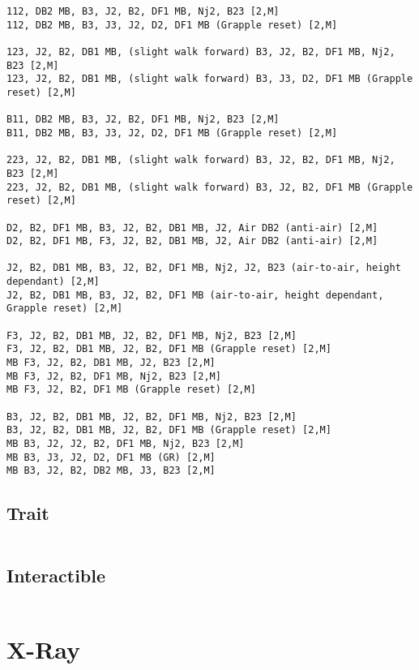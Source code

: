 \documentclass[main.tex]{subfiles}
\begin{document}
\begin{lstlisting}[language=FG]
112, DB2 MB, B3, J2, B2, DF1 MB, Nj2, B23 [2,M]
112, DB2 MB, B3, J3, J2, D2, DF1 MB (Grapple reset) [2,M]

123, J2, B2, DB1 MB, (slight walk forward) B3, J2, B2, DF1 MB, Nj2, B23 [2,M]
123, J2, B2, DB1 MB, (slight walk forward) B3, J3, D2, DF1 MB (Grapple reset) [2,M]

B11, DB2 MB, B3, J2, B2, DF1 MB, Nj2, B23 [2,M]
B11, DB2 MB, B3, J3, J2, D2, DF1 MB (Grapple reset) [2,M]

223, J2, B2, DB1 MB, (slight walk forward) B3, J2, B2, DF1 MB, Nj2, B23 [2,M]
223, J2, B2, DB1 MB, (slight walk forward) B3, J2, B2, DF1 MB (Grapple reset) [2,M]

D2, B2, DF1 MB, B3, J2, B2, DB1 MB, J2, Air DB2 (anti-air) [2,M]
D2, B2, DF1 MB, F3, J2, B2, DB1 MB, J2, Air DB2 (anti-air) [2,M]

J2, B2, DB1 MB, B3, J2, B2, DF1 MB, Nj2, J2, B23 (air-to-air, height dependant) [2,M]
J2, B2, DB1 MB, B3, J2, B2, DF1 MB (air-to-air, height dependant, Grapple reset) [2,M]

F3, J2, B2, DB1 MB, J2, B2, DF1 MB, Nj2, B23 [2,M]
F3, J2, B2, DB1 MB, J2, B2, DF1 MB (Grapple reset) [2,M]
MB F3, J2, B2, DB1 MB, J2, B23 [2,M]
MB F3, J2, B2, DF1 MB, Nj2, B23 [2,M]
MB F3, J2, B2, DF1 MB (Grapple reset) [2,M]

B3, J2, B2, DB1 MB, J2, B2, DF1 MB, Nj2, B23 [2,M]
B3, J2, B2, DB1 MB, J2, B2, DF1 MB (Grapple reset) [2,M]
MB B3, J2, J2, B2, DF1 MB, Nj2, B23 [2,M]
MB B3, J3, J2, D2, DF1 MB (GR) [2,M]
MB B3, J2, B2, DB2 MB, J3, B23 [2,M]
\end{lstlisting}

\subsection{Trait}
\begin{lstlisting}[language=FG]
\end{lstlisting}


\subsection{Interactible}
\begin{lstlisting}[language=FG]

\end{lstlisting}

\section{X-Ray}
\begin{lstlisting}[language=FG]

\end{lstlisting}
\end{document}
